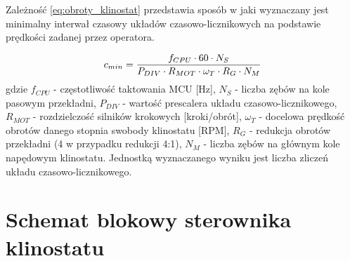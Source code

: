 Zależność \ref{eq:obroty_klinostat} przedstawia sposób w jaki wyznaczany jest minimalny interwał czasowy układów czasowo-licznikowych na podstawie prędkości zadanej przez operatora.

\begin{equation}\label{eq:obroty_klinostat}
	c_{min} = \frac{f_{CPU} \cdot 60 \cdot N_S}{P_{DIV} \cdot R_{MOT} \cdot \omega_T \cdot R_G \cdot N_M}
	\vspace{3mm}
\end{equation}
gdzie $f_{CPU}$ - częstotliwość taktowania MCU  [Hz], $N_S$ - liczba zębów na kole pasowym przekładni, $P_{DIV}$ - wartość prescalera układu czasowo-licznikowego, $R_{MOT}$ - rozdzielczość silników krokowych [kroki/obrót], $\omega_T$ - docelowa prędkość obrotów danego stopnia swobody klinostatu [RPM], $R_G$ - redukcja obrotów przekładni (4 w przypadku redukcji 4:1), $N_M$ - liczba zębów na głównym kole napędowym klinostatu. Jednostką wyznaczanego wyniku jest liczba zliczeń układu czasowo-licznikowego.

\section{Schemat blokowy sterownika klinostatu}

